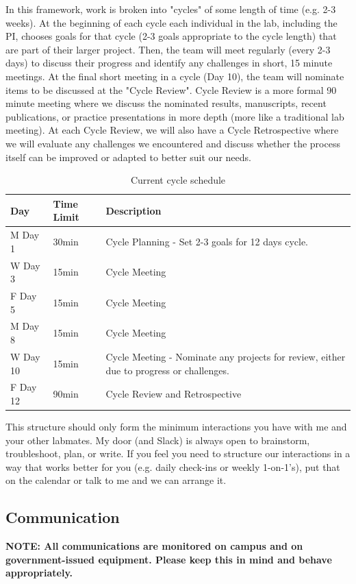 \documentclass[10pt, letterpaper, twocolumn]{article} %
\begin{document}
In this framework, work is broken into "cycles" of some length of time (e.g. 2-3 weeks). At the beginning of each cycle each individual in the lab, including the PI, chooses goals for that cycle (2-3 goals appropriate to the cycle length) that are part of their larger project. Then, the team will meet regularly (every 2-3 days) to discuss their progress and identify any challenges in short, 15 minute meetings. At the final short meeting in a cycle (Day 10), the team will nominate items to be discussed at the "Cycle Review". Cycle Review is a more formal 90 minute meeting where we discuss the nominated results, manuscripts, recent publications, or practice presentations in more depth (more like a traditional lab meeting). At each Cycle Review, we will also have a Cycle Retrospective where we will evaluate any challenges we encountered and discuss whether the process itself can be improved or adapted to better suit our needs.

\begin{table}
	\caption{Current cycle schedule}
	\centering
	\begin{tabular}{lll}
		\toprule
		\cmidrule(r){1-2}
		Day & Time Limit & Description \\
		\midrule
		M Day 1 & 30min & Cycle Planning - Set 2-3 goals for 12 days cycle. \\
		W Day 3 & 15min & Cycle Meeting  \\
		F Day 5 & 15min & Cycle Meeting \\
		M Day 8 & 15min & Cycle Meeting \\
		W Day 10 & 15min & Cycle Meeting - Nominate any projects for review, either due to progress or challenges.  \\
		F Day 12 & 90min & Cycle Review and Retrospective \\
		\bottomrule
	\end{tabular}
\end{table}

This structure should only form the minimum interactions you have with me and your other labmates. My door (and Slack) is always open to brainstorm, troubleshoot, plan, or write. If you feel you need to structure our interactions in a way that works better for you (e.g. daily check-ins or weekly 1-on-1's), put that on the calendar or talk to me and we can arrange it.

\subsection{Communication}
{\bfseries NOTE: All communications are monitored on campus and on government-issued equipment. Please keep this in mind and behave appropriately.}
\end{document}
